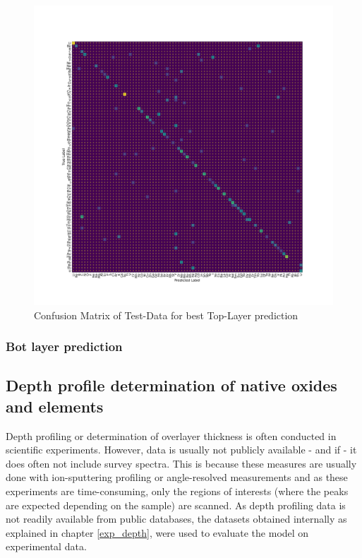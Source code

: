 \begin{center}
\begin{figure}[H]
        \centerline{\includegraphics[width=1.4\textwidth]{Figures/best_task_1_model_CM.png}}
    \centering
    \caption{Confusion Matrix of Test-Data for best Top-Layer prediction}
    \label{cm_cnn_1l}
\end{figure}
\end{center}

\subsubsection{Bot layer prediction}


\subsection{Depth profile determination of native oxides and elements}
Depth profiling or determination of overlayer thickness is often conducted in scientific experiments. However, data is usually not publicly available - and if - it does often not include survey spectra. This is because these measures are usually done with ion-sputtering profiling or angle-resolved measurements and as these experiments are time-consuming, only the regions of interests (where the peaks are expected depending on the sample) are scanned.
As depth profiling data is not readily available from public databases, the datasets obtained internally as explained in chapter \ref{exp_depth}, were used to evaluate the model on experimental data.


